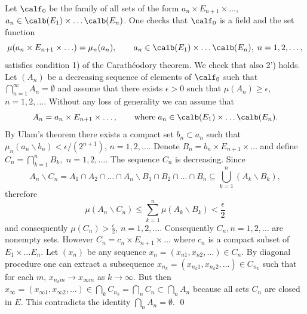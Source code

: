 \documentclass[preprint]{imsart}
\begin{document}
{
Let $\calf_0$ be the family of all sets of the form $
a_n\times E_{n+1}\times\ldots$, $a_n\in
\calb(E_1)\times \ldots\calb(E_n)$. One checks that
$\calf_0$ is a field and the set function
$$
\mu(a_n\times E_{n+1}\times\ldots)=\mu_n(a_n),
\qquad
a_n\in\calb(E_1)\times \ldots\calb(E_n),\;
n=1,2,\ldots,
$$
satisfies condition 1) of the Carath\'eodory theorem.
We check that also 2') holds. Let $(A_n)$ be a
decreasing sequence of elements of $\calf_0$ such that
$\bigcap_{n=1}^\infty A_n=\emptyset$ and assume that
there exists $\epsilon >0$ such that $\mu (A_n)\geq
\epsilon$, $n=1,2,\ldots$. Without any loss
of generality we can assume that
$$
A_n=a_n\times E_{n+1}\times\ldots,
\qquad {\rm where\;} a_n\in
\calb(E_1)\times \ldots\calb(E_n).
$$
By Ulam's theorem there exists a compact set
$b_n\subset a_n$ such that $\mu_n(a_n\backslash b_n)<
\epsilon /(2^{n+1})$, $n=1,2,\ldots$. Denote
$B_n=b_n\times E_{n+1}\times\ldots$ and define
$C_n=\bigcap_{k=1}^nB_k,$ $n=1,2,\ldots$. The sequence
$C_n$ is decreasing. Since
$$
A_n\backslash C_n = A_1\cap A_2\cap\ldots\cap A_n
\backslash B_1\cap B_2\cap\ldots\cap B_n
\subseteq \bigcup_{k=1}^n(A_k\backslash B_k),
$$
therefore
$$
\mu (A_n\backslash C_n )\leq \sum_{k=1}^n
\mu ( A_k\backslash B_k )<\frac{\epsilon}{2}
$$
and consequently $\mu(C_n)>\frac{\epsilon}{2}$,
$n=1,2,\ldots$. Consequently $C_n,n=1,2,\ldots$ are nonempty sets.
However $C_n=c_n\times
E_{n+1}\times\ldots$ where $c_n$ is a compact subset of
$E_1\times\ldots E_n$. Let $(x_n)$ be any sequence
$x_n=(x_{n1},x_{n2},\ldots)\in C_n$. By diagonal
procedure one can extract a subsequence $x_{n_k}=
(x_{n_k1},x_{n_k2},\ldots)\in C_{n_k}$ such that for
each $m$, $x_{n_km}\to x_{\infty m}$ as $k\to\infty$.
But then $x_\infty =(x_{\infty 1},x_{\infty
2},\ldots)\in \bigcap_kC_{n_k}=\bigcap_nC_{n}\subset
\bigcap_nA_n$ because all sets $C_n$ are closed
in $E$. This contradicts the identity
$\bigcap_nA_n=\emptyset$. \qed

}
\end{document}
